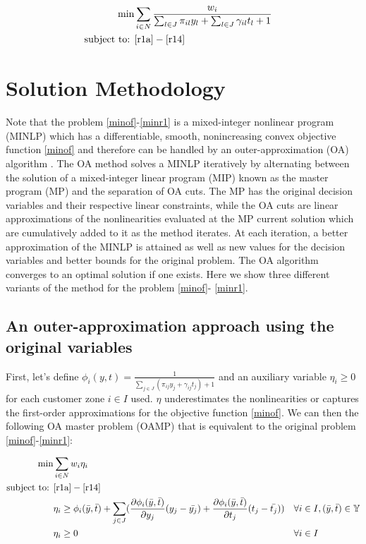 \documentclass[num-refs]{wiley-networks}
\begin{document}
\begin{align}
    \label{minof} \min & \sum_{i \in N}\frac{w_i}{\sum_{l \in J} \pi_{il} y_l + \sum_{l \in J} \gamma_{il} t_l + 1}  && \\
    \label{minr1} \text{subject to: } & \eqref{r1a}-\eqref{r14} &&
\end{align}

%
\section{Solution Methodology}
Note that the problem \eqref{minof}-\eqref{minr1} is a mixed-integer nonlinear program (MINLP) which has a differentiable, smooth, nonincreasing convex objective function \eqref{minof} and therefore can be handled by an outer-approximation (OA) algorithm \citep{duran1986outer}.
The OA method solves a MINLP iteratively by alternating between the solution of a mixed-integer linear program (MIP) known as the master program (MP) and the separation of OA cuts. The MP has the original decision variables and their respective linear constraints, while the OA cuts are linear approximations of the nonlinearities
evaluated at the MP current solution which are cumulatively added to it as
the method iterates. At each iteration, a better approximation of the MINLP is attained as well as new values for the decision variables and better bounds for
the original problem. 
The OA algorithm converges to an optimal solution if one exists.
Here we show three different variants of the method for the problem \eqref{minof}-
\eqref{minr1}.


\subsection{An outer-approximation approach using the original variables}

First, let's  define $\phi_i(y,t)= \frac{1}{\sum_{j \in J} (\pi_{ij} y_j + \gamma_{ij} t_j) + 1}$ and an auxiliary variable $\eta_i \geq 0$ for each customer zone $i\in I$ used. $\eta$ underestimates the nonlinearities or captures the first-order approximations for the objective function \eqref{minof}. We can then the following OA master problem (OAMP) 
that is equivalent to the original problem \eqref{minof}-\eqref{minr1}:

\begin{align}
    \label{oaminof} \min & \sum_{i \in N}w_i \eta_i && \\
    \label{oaminr1} \text{subject to: } & \eqref{r1a}-\eqref{r14} && \\
    \label{oacutsorig}  & \eta_i \geq \phi_i(\bar{y},\bar{t}) + \sum_{j\in J} (\frac{\partial{\phi_i(\bar{y},\bar{t}})}{\partial{y_j}}(y_j - \bar{y_j})+ \frac{\partial{\phi_i(\bar{y},\bar{t}})}{\partial{t_j}}(t_j - \bar{t_j})) && \forall i\in I, (\bar{y},\bar{t}) \in \mathbb{Y}\\
    \label{oaetaorig} & \eta_i \geq 0 && \forall i \in I 
\end{align}
\end{document}
